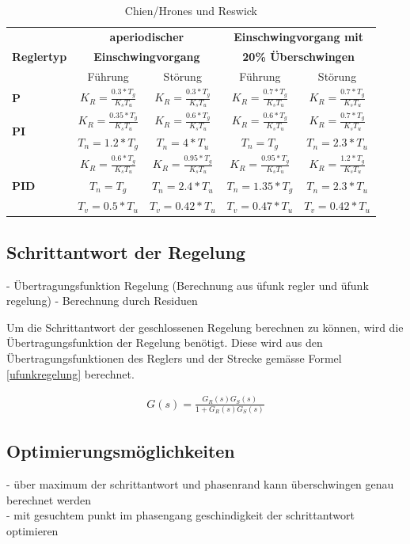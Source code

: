 \begin{table}
\centering
\renewcommand*{\arraystretch}{1.5}
\begin{tabular}{|l|c|c|c|c|}
\hline 
& \multicolumn{2}{c|}{\textbf{aperiodischer}} & \multicolumn{2}{c|}{\textbf{Einschwingvorgang mit}} \\
\textbf{Reglertyp} & \multicolumn{2}{c|}{\textbf{Einschwingvorgang}} & \multicolumn{2}{c|}{\textbf{20\% Überschwingen}}\\
\cline{2-5} 
 & Führung & Störung & Führung & Störung \\ 
\hline 
\textbf{P} & $K_R=\frac{0.3*T_g}{K_sT_u}$ & $K_R=\frac{0.3*T_g}{K_sT_u}$ & $K_R=\frac{0.7*T_g}{K_sT_u}$ & $K_R=\frac{0.7*T_g}{K_sT_u}$ \\ 
\hline 
\multirow{2}{*}{\textbf{PI}} & $K_R=\frac{0.35*T_g}{K_sT_u}$ & $K_R=\frac{0.6*T_g}{K_sT_u}$ & $K_R=\frac{0.6*T_g}{K_sT_u}$ & $K_R=\frac{0.7*T_g}{K_sT_u}$ \\ 
& $T_n=1.2*T_g$ & $T_n=4*T_u$ & $T_n=T_g$ & $T_n=2.3*T_u$ \\ 
\hline 
 & $K_R=\frac{0.6*T_g}{K_sT_u}$ & $K_R=\frac{0.95*T_g}{K_sT_u}$ & $K_R=\frac{0.95*T_g}{K_sT_u}$ & $K_R=\frac{1.2*T_g}{K_sT_u}$\\ 
\textbf{PID} & $T_n=T_g$ & $T_n=2.4*T_u$ &  $T_n=1.35*T_g$ & $T_n=2.3*T_u$ \\ 
 & $T_v=0.5*T_u$ & $T_v=0.42*T_u$ & $T_v=0.47*T_u$ & $T_v=0.42*T_u$ \\ 
\hline 
\end{tabular}
\renewcommand*{\arraystretch}{1}
\caption{Chien/Hrones und Reswick} 
\end{table}


\newpage
\subsection{Schrittantwort der Regelung}
- Übertragungsfunktion Regelung (Berechnung aus üfunk regler und üfunk regelung)\newline
- Berechnung durch Residuen\newline

Um die Schrittantwort der geschlossenen Regelung berechnen zu können, wird die Übertragungsfunktion der Regelung benötigt. Diese wird aus den Übertragungsfunktionen des Reglers und der Strecke gemässe Formel \ref{ufunkregelung} berechnet.

\begin{align}
G(s)=\frac{G_R(s)G_S(s)}{1+G_R(s)G_S(s)}
\label{ufunkregelung}
\end{align}

\subsection{Optimierungsmöglichkeiten}
- über maximum der schrittantwort und phasenrand kann überschwingen genau berechnet werden\\
- mit gesuchtem punkt im phasengang geschindigkeit der schrittantwort optimieren

